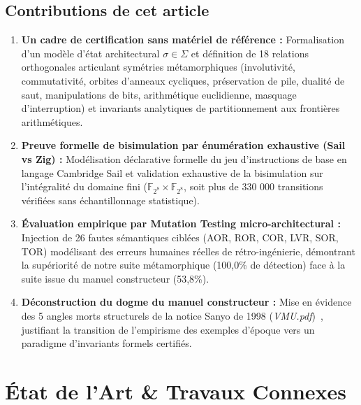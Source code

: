 \documentclass[10pt,journal,compsoc]{IEEEtran}
\begin{document}
\subsection{Contributions de cet article}
\begin{enumerate}
    \item \textbf{Un cadre de certification sans matériel de référence :} Formalisation d'un modèle d'état architectural $\sigma \in \Sigma$ et définition de 18 relations orthogonales articulant symétries métamorphiques (involutivité, commutativité, orbites d'anneaux cycliques, préservation de pile, dualité de saut, manipulations de bits, arithmétique euclidienne, masquage d'interruption) et invariants analytiques de partitionnement aux frontières arithmétiques.
    \item \textbf{Preuve formelle de bisimulation par énumération exhaustive (Sail vs Zig) :} Modélisation déclarative formelle du jeu d'instructions de base en langage Cambridge Sail et validation exhaustive de la bisimulation sur l'intégralité du domaine fini ($\mathbb{F}_{2^8} \times \mathbb{F}_{2^8}$, soit plus de 330 000 transitions vérifiées sans échantillonnage statistique).
    \item \textbf{Évaluation empirique par Mutation Testing micro-architectural :} Injection de 26 fautes sémantiques ciblées (AOR, ROR, COR, LVR, SOR, TOR) modélisant des erreurs humaines réelles de rétro-ingénierie, démontrant la supériorité de notre suite métamorphique (100,0\% de détection) face à la suite issue du manuel constructeur (53,8\%).
    \item \textbf{Déconstruction du dogme du manuel constructeur :} Mise en évidence des 5 angles morts structurels de la notice Sanyo de 1998 (\textit{VMU.pdf})~\cite{sanyo1998, sega1998}, justifiant la transition de l'empirisme des exemples d'époque vers un paradigme d'invariants formels certifiés.
\end{enumerate}

\section{État de l'Art \& Travaux Connexes}
\end{document}
